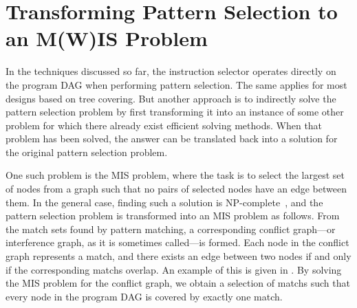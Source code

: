 \section{Transforming Pattern Selection to an M(W)IS Problem}

In the techniques discussed so far, the \gls{instruction selector} operates
directly on the \gls{program DAG} when performing \gls{pattern selection}.
%
The
same applies for most designs based on \gls{tree covering}.
%
But another approach
is to indirectly solve the \gls{pattern selection} problem by first transforming
it into an instance of some other problem for which there already exist
efficient solving methods.
%
When that problem has been solved, the answer can be
translated back into a solution for the original \gls{pattern selection}
problem.

%

One such problem is the \gls{MIS problem}, where the task is to select the
largest set of \glspl{node} from a \gls{graph} such that no pairs of selected
\glspl{node} have an \gls{edge} between them.
%
In the general case, finding such
a solution is NP-complete~\cite{Garey1979}, and the \gls{pattern
  selection} problem is transformed into an \gls{MIS problem} as follows.
%
From
the \glspl{match set} found by \gls{pattern matching}, a corresponding
\gls{conflict graph}---or \gls{interference graph}, as it is sometimes
called---is formed.
%
Each \gls{node} in the \gls{conflict graph} represents a
\gls{match}, and there exists an \gls{edge} between two \glspl{node} if and only
if the corresponding \glspl{match} overlap.
%
An example of this is given in
.
%
By solving the \gls{MIS problem} for the \gls{conflict
  graph}, we obtain a selection of \glspl{match} such that every \gls{node} in
the \gls{program DAG} is covered by exactly one \gls{match}.

